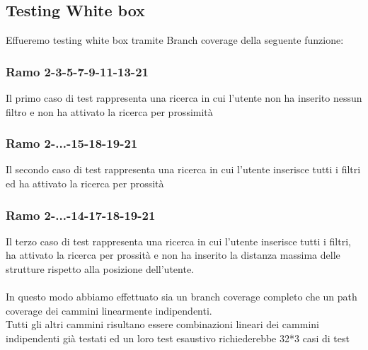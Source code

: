 \pagebreak
\subsection{Testing White box}
Effueremo testing white box tramite Branch coverage della seguente funzione:







\subsubsection{Ramo 2-3-5-7-9-11-13-21}
Il primo caso di test rappresenta una ricerca in cui l'utente non ha inserito nessun filtro e non ha attivato la ricerca per prossimità

\subsubsection{Ramo 2-...-15-18-19-21}
Il secondo caso di test rappresenta una ricerca in cui l'utente inserisce tutti i filtri ed ha attivato la ricerca per prossità

\subsubsection{Ramo 2-...-14-17-18-19-21}
Il terzo caso di test rappresenta una ricerca in cui l'utente inserisce tutti i filtri, ha attivato la ricerca per prossità e non ha inserito la distanza massima delle strutture rispetto alla posizione dell'utente.\\
\\
In questo modo abbiamo effettuato sia un branch coverage completo che un path coverage dei cammini linearmente indipendenti.\\ Tutti gli altri cammini risultano essere combinazioni lineari
dei cammini indipendenti già testati ed un loro test esaustivo richiederebbe 32*3 casi di test